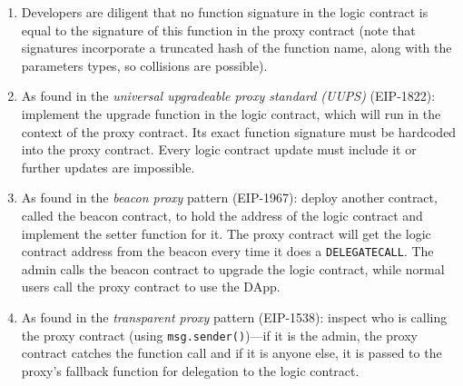 \begin{enumerate}


\item Developers are diligent that no function signature in the logic contract is equal to the signature of this function in the proxy contract (note that signatures incorporate a truncated hash of the function name, along with the parameters types, so collisions are possible). 

\item As found in the \emph{universal upgradeable proxy standard (UUPS)} (EIP-1822): implement the upgrade function in the logic contract, which will run in the context of the proxy contract. Its exact function signature must be hardcoded into the proxy contract. Every logic contract update must include it or further updates are impossible.

\item As found in the \textit{beacon proxy} pattern (EIP-1967): deploy another contract, called the beacon contract, to hold the address of the logic contract and implement the setter function for it. The proxy contract will get the logic contract address from the beacon every time it does a \texttt{DELEGATECALL}. The admin calls the beacon contract to upgrade the logic contract, while normal users call the proxy contract to use the DApp. 

\item As found in the \textit{transparent proxy} pattern (EIP-1538): inspect who is calling the proxy contract (using \texttt{msg.sender()})---if it is the admin, the proxy contract catches the function call and if it is anyone else, it is passed to the proxy's fallback function for delegation to the logic contract. 

\end{enumerate}


